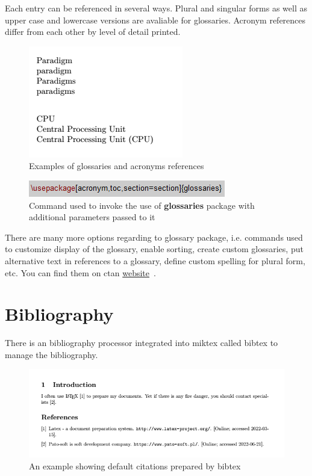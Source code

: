 Each entry can be referenced in several ways. Plural and singular forms as well as upper case and lowercase versions are avaliable for glossaries. Acronym references differ from each other by level of detail printed.

\begin{figure}[H]
\centering
\includegraphics[scale=1.0]{content/LaTeX/figures/glossary_calls.png}
\caption{Examples of glossaries and acronyms references}
\end{figure}

\begin{figure}[H]
\centering
\includegraphics[scale=1.0]{content/LaTeX/figures/usepackage_glossaries.png}
\caption{Command used to invoke the use of \textbf{glossaries} package with additional parameters passed to it}
\label{fig:usepackage_glossaries}
\end{figure}

There are many more options regarding to glossary package, i.e. commands used to customize display of the \gls{glossary}, enable sorting, create custom glossaries, put alternative text in references to a glossary, define custom spelling for plural form, etc. You can find them on \acrshort{ctan} \href{https://www.ctan.org/pkg/glossaries}{website}~\cite{ctan_glossaries}.

\section{Bibliography}

There is an bibliography processor integrated into \Gls{miktex} called \Gls{bibtex} to manage the bibliography.

\begin{figure}[H]
\centering
\includegraphics[scale=0.75]{content/LaTeX/figures/biblio_outcome.png}
\caption{An example showing default citations prepared by \gls{bibtex}}
\label{fig:bibliography_example}
\end{figure}

